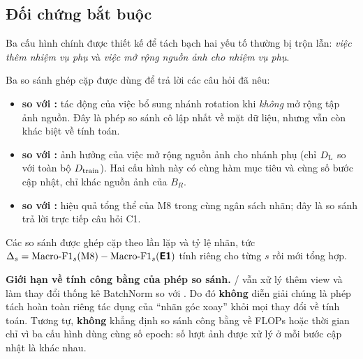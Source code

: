 \subsection{Đối chứng bắt buộc}
\label{sec:baselines}

Ba cấu hình chính được thiết kế để tách bạch hai yếu tố thường bị trộn lẫn: \emph{việc thêm
nhiệm vụ phụ} và \emph{việc mở rộng nguồn ảnh cho nhiệm vụ phụ}.





Ba so sánh ghép cặp được dùng để trả lời các câu hỏi đã nêu:

\begin{itemize}[leftmargin=1.2cm,itemsep=3pt]
  \item \textbf{ so với :} tác động của việc bổ sung nhánh rotation khi
        \emph{không} mở rộng tập ảnh nguồn. Đây là phép so sánh cô lập nhất về mặt dữ liệu,
        nhưng vẫn còn khác biệt về tính toán.
  \item \textbf{ so với :} ảnh hưởng của việc mở rộng nguồn ảnh cho nhánh phụ
        (chỉ $D_{\mathrm{L}}$ so với toàn bộ $D_{\mathrm{train}}$). Hai cấu hình này có cùng hàm mục tiêu và cùng số
        bước cập nhật, chỉ khác nguồn ảnh của $B_R$.
  \item \textbf{ so với :} hiệu quả tổng thể của M8 trong cùng ngân sách nhãn;
        đây là so sánh trả lời trực tiếp câu hỏi C1.
\end{itemize}

Các so sánh được ghép cặp theo lần lặp và tỷ lệ nhãn, tức $\Delta_s = \mathrm{Macro\text{-}F1}_s(\text{M8}) -
\mathrm{Macro\text{-}F1}_s(\textsf{\textbf{E1}})$ tính riêng cho từng $s$ rồi mới tổng hợp.

\begin{warnbox}
\textbf{Giới hạn về tính công bằng của phép so sánh.} / vẫn xử lý thêm view và
làm thay đổi thống kê BatchNorm so với . Do đó \textbf{không} diễn giải chúng là phép
tách hoàn toàn riêng tác dụng của \enquote{nhãn góc xoay} khỏi mọi thay đổi về tính toán.
Tương tự, \textbf{không} khẳng định so sánh công bằng về FLOPs hoặc thời gian chỉ vì ba cấu hình
dùng cùng số epoch: số lượt ảnh được xử lý ở mỗi bước cập nhật là khác nhau.
\end{warnbox}
